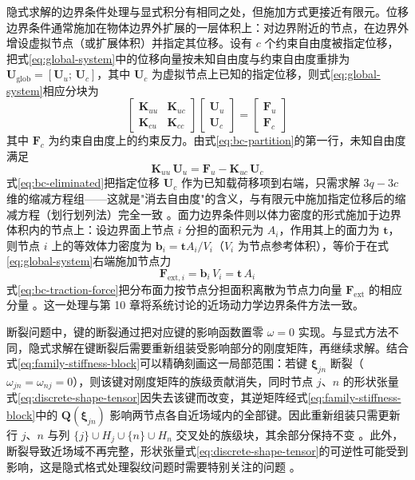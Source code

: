 隐式求解的边界条件处理与显式积分有相同之处，但施加方式更接近有限元。位移边界条件通常施加在物体边界外扩展的一层体积上：对边界附近的节点，在边界外增设虚拟节点（或扩展体积）并指定其位移。设有 $c$ 个约束自由度被指定位移，把式\eqref{eq:global-system}中的位移向量按未知自由度与约束自由度重排为 $\mathbf{U}_{\mathrm{glob}}=[\mathbf{U}_{u};\,\mathbf{U}_{c}]$，其中 $\mathbf{U}_{c}$ 为虚拟节点上已知的指定位移，则式\eqref{eq:global-system}相应分块为
\begin{equation}
  \begin{bmatrix}
    \mathbf{K}_{uu} & \mathbf{K}_{uc}\\
    \mathbf{K}_{cu} & \mathbf{K}_{cc}
  \end{bmatrix}
  \begin{bmatrix}
    \mathbf{U}_{u}\\
    \mathbf{U}_{c}
  \end{bmatrix}
  =\begin{bmatrix}
    \mathbf{F}_{u}\\
    \mathbf{F}_{c}
  \end{bmatrix}
  \label{eq:bc-partition}
\end{equation}
其中 $\mathbf{F}_{c}$ 为约束自由度上的约束反力。由式\eqref{eq:bc-partition}的第一行，未知自由度满足
\begin{equation}
  \mathbf{K}_{uu}\,\mathbf{U}_{u}=\mathbf{F}_{u}-\mathbf{K}_{uc}\,\mathbf{U}_{c}
  \label{eq:bc-eliminated}
\end{equation}
式\eqref{eq:bc-eliminated}把指定位移 $\mathbf{U}_{c}$ 作为已知载荷移项到右端，只需求解 $3q-3c$ 维的缩减方程组——这就是"消去自由度"的含义，与有限元中施加指定位移后的缩减方程（划行划列法）完全一致 \cite{Breitenfeld2014,BreitenfeldThesis2014}。面力边界条件则以体力密度的形式施加于边界体积内的节点上：设边界面上节点 $i$ 分担的面积元为 $A_i$，作用其上的面力为 $\mathbf{t}$，则节点 $i$ 上的等效体力密度为 $\mathbf{b}_i=\mathbf{t}A_i/V_i$（$V_i$ 为节点参考体积），等价于在式\eqref{eq:global-system}右端施加节点力
\begin{equation}
  \mathbf{F}_{\mathrm{ext},i}=\mathbf{b}_i\,V_i=\mathbf{t}\,A_i
  \label{eq:bc-traction-force}
\end{equation}
式\eqref{eq:bc-traction-force}把分布面力按节点分担面积离散为节点力向量 $\mathbf{F}_{\mathrm{ext}}$ 的相应分量 \cite{Breitenfeld2014}。这一处理与第 10 章将系统讨论的近场动力学边界条件方法一致。

断裂问题中，键的断裂通过把对应键的影响函数置零 $\omega=0$ 实现。与显式方法不同，隐式求解在键断裂后需要重新组装受影响部分的刚度矩阵，再继续求解。结合式\eqref{eq:family-stiffness-block}可以精确刻画这一局部范围：若键 $\boldsymbol{\xi}_{jn}$ 断裂（$\omega_{jn}=\omega_{nj}=0$），则该键对刚度矩阵的族级贡献消失，同时节点 $j$、$n$ 的形状张量式\eqref{eq:discrete-shape-tensor}因失去该键而改变，其逆矩阵经式\eqref{eq:family-stiffness-block}中的 $\mathbf{Q}(\boldsymbol{\xi}_{jn})$ 影响两节点各自近场域内的全部键。因此重新组装只需更新行 $j$、$n$ 与列 $\{j\}\cup H_{j}\cup\{n\}\cup H_{n}$ 交叉处的族级块，其余部分保持不变 \cite{Breitenfeld2014}。此外，断裂导致近场域不再完整，形状张量式\eqref{eq:discrete-shape-tensor}的可逆性可能受到影响，这是隐式格式处理裂纹问题时需要特别关注的问题 \cite{Breitenfeld2014,BreitenfeldThesis2014}。

